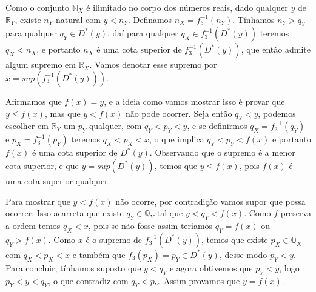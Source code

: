 \documentclass[../main.tex]{subfiles}
\begin{document}
\begin{dem}
\begin{enumerate}
\begin{enumerate}
            Como o conjunto $\mathbb{N}_X$ é ilimitado no corpo dos números reais, dado qualquer $y$ de $\mathbb{R}_Y$, existe $n_Y$ natural com $y < n_Y$.
            Definamos $n_X = f_3^{-1}(n_Y)$. Tínhamos $n_Y > q_Y$ para qualquer $q_Y \in D^*(y)$, daí para qualquer $q_X \in f_3^{-1}(D^*(y))$ teremos 
            $q_X < n_X$, e portanto $n_X$ é uma cota superior de $f_3^{-1}(D^*(y))$, que então admite algum supremo em $\mathbb{R}_X$. Vamos denotar esse supremo por $x = sup(f_3^{-1}(D^*(y)))$. 

            Afirmamos que $f(x) = y$, e a ideia como vamos mostrar isso é provar que $y \leq f(x)$, mas que $y < f(x)$ não pode ocorrer.
            Seja então $q_Y < y$, podemos escolher em $\mathbb{R}_Y$ um $p_Y$ qualquer, com $q_Y < p_Y < y$, e se definirmos $q_X = f_3^{-1}(q_Y)$ e 
            $p_X = f_3^{-1}(p_Y)$ teremos $q_X < p_X < x$, o que implica $q_Y < p_Y < f(x)$ e portanto $f(x)$ é uma cota superior de $D^*(y)$. Observando que o supremo é a menor cota superior, e que $y = sup (D^*(y))$, temos que $y \leq f(x)$, pois $f(x)$ é uma cota superior qualquer.

            Para mostrar que $y < f(x)$ não ocorre, por contradição vamos supor que possa ocorrer. Isso acarreta que existe $q_Y \in \mathbb{Q}_Y$
            tal que $y < q_Y < f(x)$. Como $f$ preserva a ordem temos $q_X < x$, pois se não fosse assim teríamos $q_Y = f(x) $ ou $ q_Y > f(x)$.
            Como $x$ é o supremo de $f_3^{-1}(D^*(y))$, temos que existe $p_X \in \mathbb{Q}_X$ com $q_X < p_X < x$ e também que $f_3(p_X) = p_Y \in D^*(y)$, desse modo $p_Y < y$. Para concluir, tínhamos suposto que $y < q_Y$ e agora obtivemos que $p_Y < y$, logo $p_Y < y < q_Y$, o que contradiz com $q_Y < p_Y$. Assim provamos que $y = f(x)$.


\end{enumerate}
\end{enumerate}
\end{dem}
\end{document}
